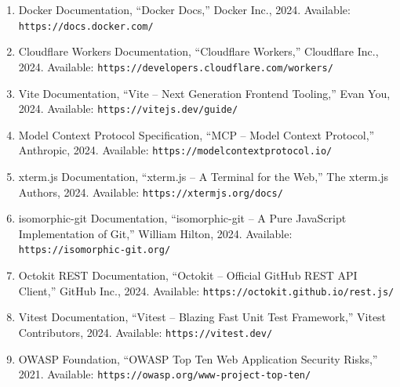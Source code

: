 \documentclass[12pt,a4paper,openany]{report}
\begin{document}
\begin{enumerate}
    \item Docker Documentation, ``Docker Docs,'' Docker Inc., 2024. Available: \texttt{https://docs.docker.com/}

    \item Cloudflare Workers Documentation, ``Cloudflare Workers,'' Cloudflare Inc., 2024. Available: \texttt{https://developers.cloudflare.com/workers/}

    \item Vite Documentation, ``Vite -- Next Generation Frontend Tooling,'' Evan You, 2024. Available: \texttt{https://vitejs.dev/guide/}

    \item Model Context Protocol Specification, ``MCP -- Model Context Protocol,'' Anthropic, 2024. Available: \texttt{https://modelcontextprotocol.io/}

    \item xterm.js Documentation, ``xterm.js -- A Terminal for the Web,'' The xterm.js Authors, 2024. Available: \texttt{https://xtermjs.org/docs/}

    \item isomorphic-git Documentation, ``isomorphic-git -- A Pure JavaScript Implementation of Git,'' William Hilton, 2024. Available: \texttt{https://isomorphic-git.org/}

    \item Octokit REST Documentation, ``Octokit -- Official GitHub REST API Client,'' GitHub Inc., 2024. Available: \texttt{https://octokit.github.io/rest.js/}

    \item Vitest Documentation, ``Vitest -- Blazing Fast Unit Test Framework,'' Vitest Contributors, 2024. Available: \texttt{https://vitest.dev/}

    \item OWASP Foundation, ``OWASP Top Ten Web Application Security Risks,'' 2021. Available: \texttt{https://owasp.org/www-project-top-ten/}
\end{enumerate}
\end{document}
